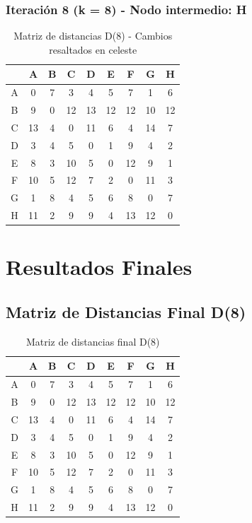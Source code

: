 \documentclass[12pt]{article}
\begin{document}
\subsubsection{Iteración 8 (k = 8) - Nodo intermedio: H}
\begin{table}[h!]
\centering
\begin{tabular}{|c|c|c|c|c|c|c|c|c|}
\hline
 & A & B & C & D & E & F & G & H \\\hline
A & 0 & 7 & 3 & 4 & 5 & 7 & 1 & 6 \\\hline
B & 9 & 0 & 12 & 13 & 12 & 12 & 10 & 12 \\\hline
C & 13 & 4 & 0 & 11 & 6 & 4 & 14 & 7 \\\hline
D & 3 & \cellcolor{lightgreen} 4 & 5 & 0 & 1 & 9 & 4 & 2 \\\hline
E & 8 & \cellcolor{lightgreen} 3 & 10 & 5 & 0 & 12 & 9 & 1 \\\hline
F & 10 & \cellcolor{lightgreen} 5 & 12 & 7 & 2 & 0 & 11 & 3 \\\hline
G & 1 & 8 & 4 & 5 & 6 & 8 & 0 & 7 \\\hline
H & 11 & 2 & 9 & 9 & 4 & 13 & 12 & 0 \\\hline
\end{tabular}
\caption{Matriz de distancias D(8) - Cambios resaltados en celeste}
\end{table}

\clearpage
\section{Resultados Finales}
\subsection{Matriz de Distancias Final D(8)}
\begin{table}[h!]
\centering
\begin{tabular}{|c|c|c|c|c|c|c|c|c|}
\hline
 & A & B & C & D & E & F & G & H \\\hline
A & 0 & 7 & 3 & 4 & 5 & 7 & 1 & 6 \\\hline
B & 9 & 0 & 12 & 13 & 12 & 12 & 10 & 12 \\\hline
C & 13 & 4 & 0 & 11 & 6 & 4 & 14 & 7 \\\hline
D & 3 & 4 & 5 & 0 & 1 & 9 & 4 & 2 \\\hline
E & 8 & 3 & 10 & 5 & 0 & 12 & 9 & 1 \\\hline
F & 10 & 5 & 12 & 7 & 2 & 0 & 11 & 3 \\\hline
G & 1 & 8 & 4 & 5 & 6 & 8 & 0 & 7 \\\hline
H & 11 & 2 & 9 & 9 & 4 & 13 & 12 & 0 \\\hline
\end{tabular}
\caption{Matriz de distancias final D(8)}
\end{table}
\end{document}
